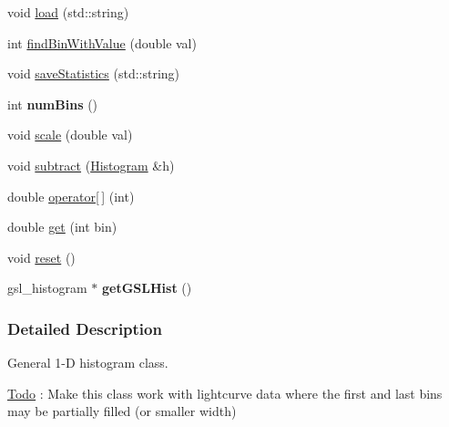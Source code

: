 \begin{DoxyCompactItemize}
\item 
void \hyperlink{classHistogram_aec3e06fe7bbbd75cf0b3a2c9e44da2df}{load} (std::string)
\item 
int \hyperlink{classHistogram_a7f7a8382c6450c8b2f58644d569350fe}{findBinWithValue} (double val)
\item 
void \hyperlink{classHistogram_a3f1ace79184ce1eb65b08d7cef9c3ef7}{saveStatistics} (std::string)
\item 
\hypertarget{classHistogram_ad841b25d1f867051f99539bfe88b0dc1}{
int {\bfseries numBins} ()}
\label{classHistogram_ad841b25d1f867051f99539bfe88b0dc1}

\item 
\hypertarget{classHistogram_ad63d2457f4c475441626169ac47c6280}{
void \hyperlink{classHistogram_ad63d2457f4c475441626169ac47c6280}{scale} (double val)}
\label{classHistogram_ad63d2457f4c475441626169ac47c6280}

\item 
void \hyperlink{classHistogram_a2714fcfb141d09432600fc8e6c65d3f3}{subtract} (\hyperlink{classHistogram}{Histogram} \&h)
\item 
\hypertarget{classHistogram_a60716135cdc3419f91875f0d89e03a9a}{
double \hyperlink{classHistogram_a60716135cdc3419f91875f0d89e03a9a}{operator\mbox{[}$\,$\mbox{]}} (int)}
\label{classHistogram_a60716135cdc3419f91875f0d89e03a9a}

\item 
double \hyperlink{classHistogram_ab93e201f4b23def54a4ce5fda5c9d085}{get} (int bin)
\item 
\hypertarget{classHistogram_ab18fbea2f675c873c9c90d60eaf5dd28}{
void \hyperlink{classHistogram_ab18fbea2f675c873c9c90d60eaf5dd28}{reset} ()}
\label{classHistogram_ab18fbea2f675c873c9c90d60eaf5dd28}

\item 
\hypertarget{classHistogram_aa8efafbdf6c0f5c927c32fa4e132767c}{
gsl\_\-histogram $\ast$ {\bfseries getGSLHist} ()}
\label{classHistogram_aa8efafbdf6c0f5c927c32fa4e132767c}

\end{DoxyCompactItemize}


\subsubsection{Detailed Description}
General 1-\/D histogram class. 

\begin{Desc}
\item[\hyperlink{todo__todo000020}{Todo}]: Make this class work with lightcurve data where the first and last bins may be partially filled (or smaller width) \end{Desc}


